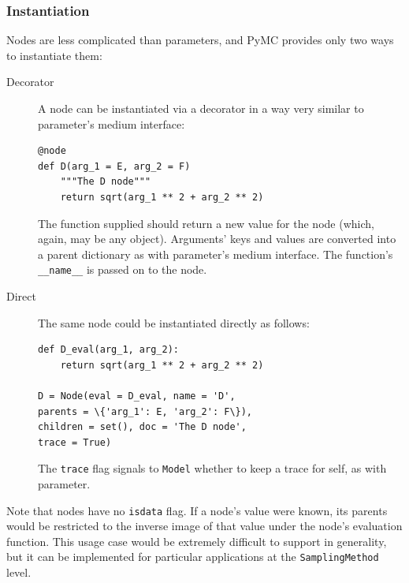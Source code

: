\documentclass[]{book}
\begin{document}
\subsubsection{Instantiation}
Nodes are less complicated than parameters, and PyMC provides only two ways to instantiate them:
\begin{description}
    \item[Decorator] A node can be instantiated via a decorator in a way very similar to parameter's medium interface:
\begin{verbatim}
@node
def D(arg_1 = E, arg_2 = F)
    """The D node"""
    return sqrt(arg_1 ** 2 + arg_2 ** 2)
\end{verbatim}
The function supplied should return a new value for the node (which, again, may be any object). Arguments' keys and values are converted into a parent dictionary as with parameter's medium interface. The function's \texttt{\_\_name\_\_} is passed on to the node.
    \item[Direct] The same node could be instantiated directly as follows:
\begin{verbatim}
def D_eval(arg_1, arg_2):
    return sqrt(arg_1 ** 2 + arg_2 ** 2)

D = Node(eval = D_eval, name = 'D',
parents = \{'arg_1': E, 'arg_2': F\}),
children = set(), doc = 'The D node',
trace = True)
\end{verbatim}
The \texttt{trace} flag signals to \texttt{Model} whether to keep a trace for self, as with parameter.
\end{description}
Note that nodes have no \texttt{isdata} flag. If a node's value were known, its parents would be restricted to the inverse image of that value under the node's evaluation function. This usage case would be extremely difficult to support in generality, but it can be implemented for particular applications at the \texttt{SamplingMethod} level.
\end{document}
